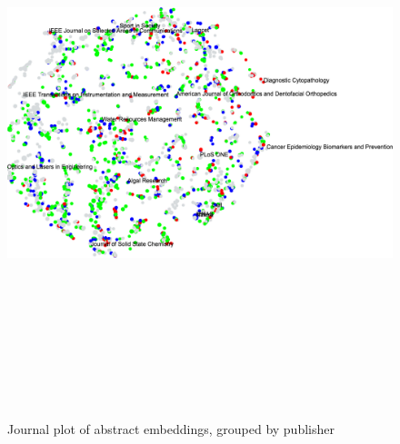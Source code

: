 \documentclass[../../paper.tex]{subfiles}
\begin{document}
\begin{landscape}
\begin{figure}
\begin{center}
\includegraphics[height=6.5in]{Plots/Journal_Plots/Abstract_normal}
\end{center}
\caption{Journal plot of abstract embeddings, grouped by publisher}\label{figure:abstractPlotNormal}
\end{figure}
\end{landscape}
\end{document}
